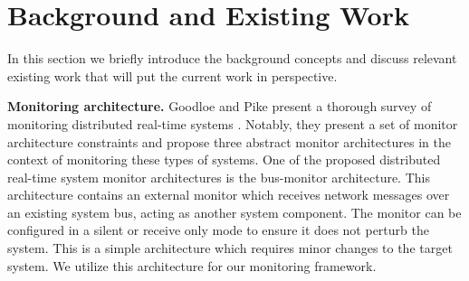 
\section{Background and Existing Work}
In this section we briefly introduce the background concepts and
discuss relevant existing work that will put the current work in perspective.

\vspace*{3pt}
\noindent
\textbf{Monitoring architecture.}
Goodloe and Pike present a thorough survey of monitoring distributed real-time systems
\cite{Goodloe2010}. Notably, they present a set of monitor architecture constraints and
propose three abstract monitor architectures in the context of monitoring these types of systems.
%
One of the proposed distributed real-time system monitor architectures is the bus-monitor architecture.
This architecture contains an external monitor which receives network messages over an existing system bus, acting as another system component.
The monitor can be configured in a silent or receive only mode to ensure it does not perturb the system.
This is a simple architecture which requires minor changes to the target system.
We utilize this architecture for our monitoring framework.

